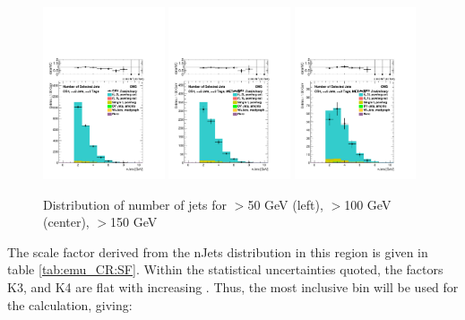 \begin{figure}[ht]
\includegraphics[width=0.32\textwidth]{Figures/bkgLostLepton/data_MC_plot__byProductionMode__nJets__elmu__ge2j_ge2t_gt0met__linScale.pdf}
\includegraphics[width=0.32\textwidth]{Figures/bkgLostLepton/data_MC_plot__byProductionMode__nJets__elmu__ge2j_ge2t_gt100met__linScale.pdf}
\includegraphics[width=0.32\textwidth]{Figures/bkgLostLepton/data_MC_plot__byProductionMode__nJets__elmu__ge2j_ge2t_gt150met__linScale.pdf}
\caption{\label{fig:bkgLostLepton:nJets} Distribution of number of jets for \MET$>$50 GeV (left), \MET$>$100 GeV (center), \MET$>$150 GeV}
\end{figure}

The scale factor derived from the nJets distribution in this region is given in table \ref{tab:emu_CR:SF}.  Within the statistical uncertainties quoted, the factors K3, and K4 are flat with increasing \MET. Thus, the most inclusive \MET bin will be used for the calculation, giving:

